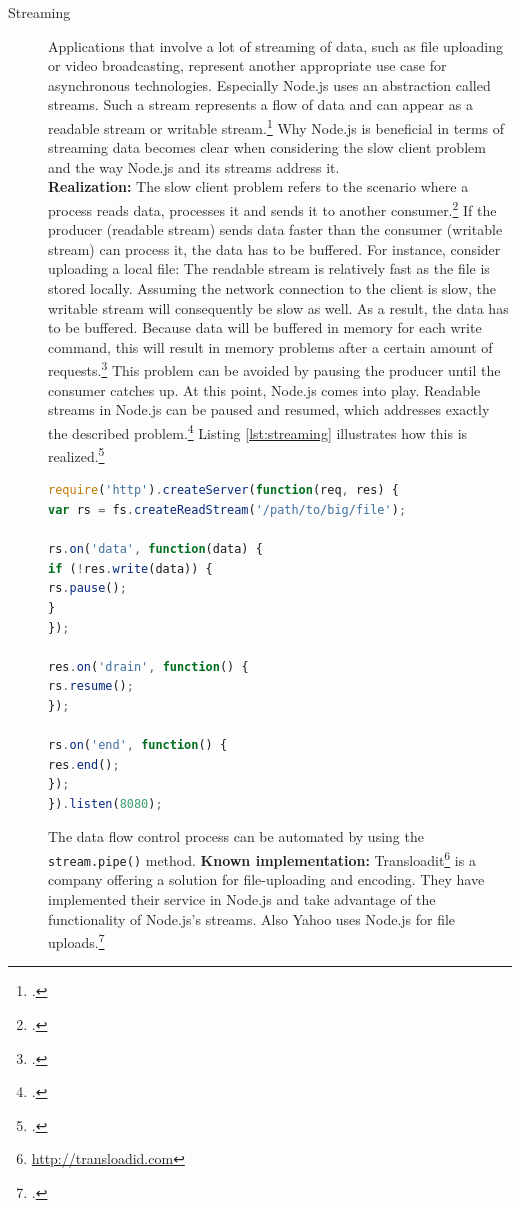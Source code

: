 \begin{description}
\item[Streaming] Applications that involve a lot of streaming of data, such
as file uploading or video broadcasting, represent another appropriate use
case for asynchronous technologies. Especially Node.js uses an abstraction
called streams. Such a stream represents a flow of data and can appear as a
readable stream or writable stream.\footcite[Cf.][75]{teixeira_2012} Why
Node.js is beneficial in terms of streaming data becomes clear when
considering the slow client problem and the way Node.js and its streams
address it.\\
\textbf{Realization:} The slow client problem refers to the scenario where a
process reads data, processes it and sends it to another consumer.\footcite[Cf.][80]{teixeira_2012}
If the producer (readable stream) sends data faster than the consumer (writable stream)
can process it, the data has to be buffered. For instance, consider uploading
a local file: The readable stream is relatively fast as the file is stored locally.
Assuming the network connection to the client is slow, the writable stream will consequently
be slow as well. As a result, the data has to be buffered. Because data will be buffered in
memory for each write command, this will result in memory problems after a certain amount of
requests.\footcite[Cf.][81]{teixeira_2012} This problem can be avoided by pausing the producer
until the consumer catches up. At this point, Node.js comes into play. Readable streams
in Node.js can be paused and resumed, which addresses exactly the described
problem.\footcite[Cf.][81]{teixeira_2012} Listing \ref{lst:streaming} illustrates
how this is realized.\footcite[Cf.][81]{teixeira_2012}

\begin{lstlisting}[language=javascript,caption={Controlling streams in Node.js},label=lst:streaming]
require('http').createServer(function(req, res) {
var rs = fs.createReadStream('/path/to/big/file');

rs.on('data', function(data) {
if (!res.write(data)) {
rs.pause();
}
});

res.on('drain', function() {
rs.resume();
});

rs.on('end', function() {
res.end();
});
}).listen(8080);
\end{lstlisting}


The data flow control process can be automated by using the
\texttt{stream.pipe()} method.
\textbf{Known implementation:}
Transloadit\footnote{\url{http://transloadid.com}} is a company offering a
solution for file-uploading and encoding. They have implemented their service
in Node.js and take advantage of the functionality of Node.js’s streams. Also
Yahoo uses Node.js for file uploads.\footcite[Cf.][]{Odell_2012}



\end{description}
